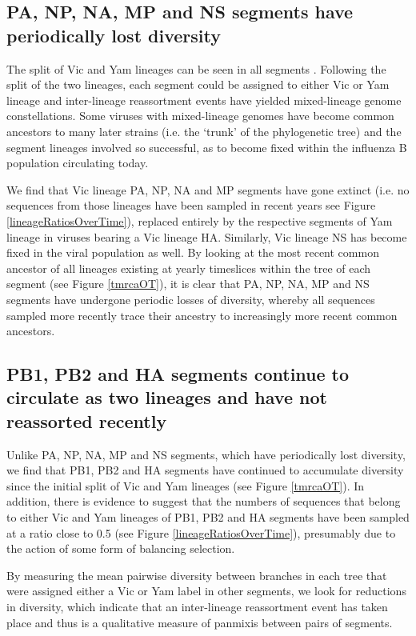 \documentclass[11pt,oneside,letterpaper]{article}
\begin{document}
\subsection*{PA, NP, NA, MP and NS segments have periodically lost diversity}

The split of Vic and Yam lineages can be seen in all segments \cite{chen2008}.
Following the split of the two lineages, each segment could be assigned to either Vic or Yam lineage and inter-lineage reassortment events have yielded mixed-lineage genome constellations.
Some viruses with mixed-lineage genomes have become common ancestors to many later strains (i.e. the `trunk' of the phylogenetic tree) and the segment lineages involved so successful, as to become fixed within the influenza B population circulating today.

We find that Vic lineage PA, NP, NA and MP segments have gone extinct (i.e. no sequences from those lineages have been sampled in recent years see Figure \ref{lineageRatiosOverTime}), replaced entirely by the respective segments of Yam lineage in viruses bearing a Vic lineage HA.
Similarly, Vic lineage NS has become fixed in the viral population as well.
By looking at the most recent common ancestor of all lineages existing at yearly timeslices within the tree of each segment (see Figure \ref{tmrcaOT}), it is clear that PA, NP, NA, MP and NS segments have undergone periodic losses of diversity, whereby all sequences sampled more recently trace their ancestry to increasingly more recent common ancestors.


\subsection*{PB1, PB2 and HA segments continue to circulate as two lineages and have not reassorted recently}
Unlike PA, NP, NA, MP and NS segments, which have periodically lost diversity, we find that PB1, PB2 and HA segments have continued to accumulate diversity since the initial split of Vic and Yam lineages (see Figure \ref{tmrcaOT}).
In addition, there is evidence to suggest that the numbers of sequences that belong to either Vic and Yam lineages of PB1, PB2 and HA segments have been sampled at a ratio close to 0.5 (see Figure \ref{lineageRatiosOverTime}), presumably due to the action of some form of balancing selection.

By measuring the mean pairwise diversity between branches in each tree that were assigned either a Vic or Yam label in other segments, we look for reductions in diversity, which indicate that an inter-lineage reassortment event has taken place and thus is a qualitative measure of panmixis between pairs of segments.
\end{document}
